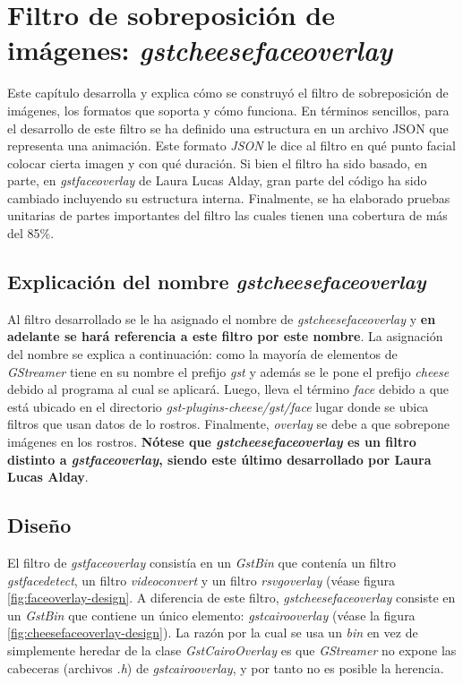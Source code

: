 \documentclass[a4paper,openright,12pt]{report}
\begin{document}
\chapter{Filtro de sobreposición de imágenes: \textit{gstcheesefaceoverlay}}
Este capítulo desarrolla y explica cómo se construyó el filtro de sobreposición
de imágenes, los formatos que soporta y cómo funciona. En términos
sencillos, para el desarrollo de este filtro se ha definido una estructura en
un archivo JSON que representa una animación. Este formato \textit{JSON} le dice
al filtro en qué punto facial colocar cierta imagen y con qué duración. Si bien
el filtro ha sido basado, en parte, en \textit{gstfaceoverlay} de
Laura Lucas Alday, gran parte del código ha sido cambiado incluyendo su
estructura interna. Finalmente, se ha elaborado pruebas unitarias de partes
importantes del filtro las cuales tienen una cobertura de más del 85\%.\\

\section{Explicación del nombre \textit{gstcheesefaceoverlay}}
Al filtro desarrollado se le ha asignado el nombre de
\textit{gstcheesefaceoverlay} y \textbf{en adelante se hará referencia a este
filtro por este nombre}. La asignación del nombre se explica a continuación:
como la mayoría de elementos de \textit{GStreamer} tiene en su nombre el prefijo
\textit{gst} y además se le pone el prefijo \textit{cheese} debido al programa
al cual se aplicará. Luego, lleva el término \textit{face} debido a que está
ubicado en el directorio \textit{gst-plugins-cheese/gst/face} lugar donde se
ubica filtros que usan datos de lo rostros. Finalmente, \textit{overlay} se debe
a que sobrepone imágenes en los rostros. \textbf{Nótese que
\textit{gstcheesefaceoverlay} es un filtro distinto a \textit{gstfaceoverlay},
siendo este último desarrollado por Laura Lucas Alday}.\\

\section{Diseño}
El filtro de \textit{gstfaceoverlay} consistía en un \textit{GstBin} que
contenía un filtro \textit{\gls{gstfacedetect}}, un filtro \textit{videoconvert} y
un filtro \textit{rsvgoverlay} (véase figura \ref{fig:faceoverlay-design}.
A diferencia de este filtro, \textit{gstcheesefaceoverlay} consiste en un
\textit{GstBin} que contiene un único elemento: \textit{\gls{gstcairooverlay}} (véase
la figura \ref{fig:cheesefaceoverlay-design}). La razón por la cual se usa un
\textit{bin} en vez de simplemente heredar de la clase \textit{GstCairoOverlay}
es que \textit{GStreamer} no expone las cabeceras (archivos \textit{.h}) de
\textit{\gls{gstcairooverlay}}, y por tanto no es posible la herencia.
\end{document}

